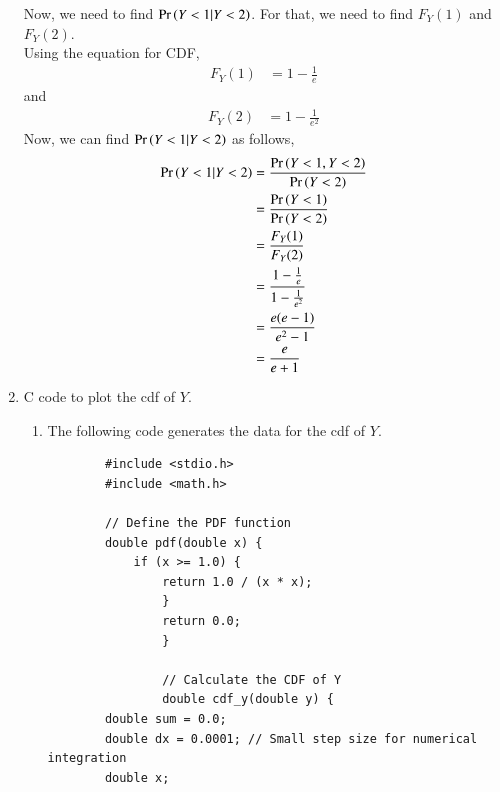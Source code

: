 \documentclass[journal,11pt]{IEEEtran}
\begin{document}
\begin{enumerate}
Now, we need to find $\Pr\left(Y<1 | Y<2 \right)$.
For that, we need to find $F_Y(1)$ and $F_Y(2)$.\\
Using the equation for CDF,
\begin{align}
    F_Y(1) & = 1 - \frac{1}{e}
\end{align}
and
\begin{align}
    F_Y(2) & = 1 - \frac{1}{e^2}
\end{align}
Now, we can find $\Pr\left(Y<1 | Y<2 \right)$ as follows,
\begin{align}
    \Pr\left(Y<1 | Y<2 \right) & = \frac{\Pr\left(Y<1 , Y<2\right)}{\Pr\left(Y<2\right)}           \\
                    & = \frac{\Pr\left(Y<1\right)}{\Pr\left(Y<2\right)}                 \\
                    & = \frac{F_Y(1)}{F_Y(2)}                     \\
                    & = \frac{1 - \frac{1}{e}}{1 - \frac{1}{e^2}} \\
                    & = \frac{e(e-1)}{e^2-1}                      \\
                    & = \frac{e}{e+1}
\end{align}

\item C code to plot the cdf of $Y$.
\begin{enumerate}
\item The following code generates the data for the cdf of $Y$.


\lstset{escapechar=@,style=customc}
\begin{lstlisting}
        #include <stdio.h>
        #include <math.h>
        
        // Define the PDF function
        double pdf(double x) {
            if (x >= 1.0) {
                return 1.0 / (x * x);
                }
                return 0.0;
                }
                
                // Calculate the CDF of Y
                double cdf_y(double y) {
        double sum = 0.0;
        double dx = 0.0001; // Small step size for numerical integration
        double x;
        

\end{lstlisting}
\end{enumerate}
\end{enumerate}
\end{document}
